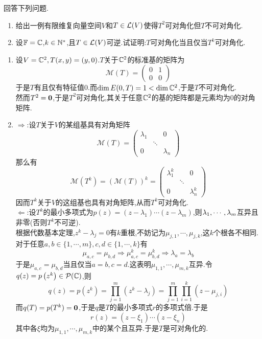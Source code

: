 \documentclass{ctexart}
\begin{document}
\begin{problem}[14.]
    回答下列问题.
    \begin{enumerate}[label=\tbf{(\arabic*)}]
        \item 给出一例有限维复向量空间$V$和$T\in\mathcal{L}(V)$使得$T^2$可对角化但$T$不可对角化.
        \item 设$\mathbb{F}=\mathbb{C}$,$k\in\mathbb{N}^*$,且$T\in\mathcal{L}(V)$可逆.试证明:$T$可对角化当且仅当$T^k$可对角化.
    \end{enumerate}
\end{problem}
\begin{solution}
    \begin{enumerate}[label=\tbf{(\arabic*)}]
        \item 设$V=\mathbb{C}^2,T(x,y)=(y,0)$.$T$关于$\mathbb{C}^2$的标准基的矩阵为
            \[\mathcal{M}(T)=\begin{pmatrix}
                0&1\\0&0
            \end{pmatrix}\]
            于是$T$有且仅有特征值$0$.而$\dim E(0,T)=1<\dim\mathbb{C}^2$,于是$T$不可对角化.\\
            然而$T^2=\mathbf0$,于是$T^2$可对角化,其关于任意$\mathbb{C}^2$的基的矩阵都是元素均为$0$的对角矩阵.
        \item $\Rightarrow$:设$T$关于$V$的某组基具有对角矩阵
            \[\mathcal{M}(T)=\begin{pmatrix}
                \lambda_1&&0\\&\ddots&\\0&&\lambda_n
            \end{pmatrix}\]
            那么有
            \[\mathcal{M}(T^k)=\left(\mathcal{M}(T)\right)^k=\begin{pmatrix}
                \lambda_1^k&&0\\&\ddots&\\0&&\lambda_n^k
            \end{pmatrix}\]
            因而$T^k$关于$V$的这组基也具有对角矩阵,从而$T^k$可对角化.\\
            $\Leftarrow$:设$T^k$的最小多项式为$p(z)=(z-\lambda_1)\cdots(z-\lambda_m)$,则${\lambda}_1,\cdots,{\lambda}_{m}$互异且非零(否则$T^k$不可逆).\\
            根据代数基本定理,$z^k-\lambda_j=0$有$k$重根,不妨记为$\mu_{j,1},\cdots,\mu_{j,k}$,这$k$个根各不相同.\\
            对于任意$a,b\in\{1,\cdots,m\},c,d\in\{1,\cdots,k\}$有
            \[\mu_{a,c}=\mu_{b,d}\Rightarrow \mu_{a,c}^k=\mu_{b,d}^k\Rightarrow \lambda_a=\lambda_b\]
            于是$\mu_{a,c}=\mu_{b,d}$当且仅当$a=b,c=d$.这表明$\mu_{1,1},\cdots,\mu_{m,k}$互异.令$q(z)=p\left(z^k\right)\in\mathcal{P}(\mathbb{C})$,则
            \[q(z)=p\left(z^k\right)=\prod_{j=1}^{m}\left(z^k-\lambda_j\right)=\prod_{j=1}^{m}\prod_{i=1}^{k}\left(z-\mu_{j,i}\right)\]
            而$q(T)=p(T^k)=\mathbf0$,于是$q$是$T$的最小多项式$r$的多项式倍.于是
            \[r(z)=(z-\xi_1)\cdots(z-\xi_n)\]
            其中各$\xi$均为$\mu_{1,1},\cdots,\mu_{m,k}$中的某个且互异.于是$T$是可对角化的.
    \end{enumerate}
\end{solution}
\end{document}

